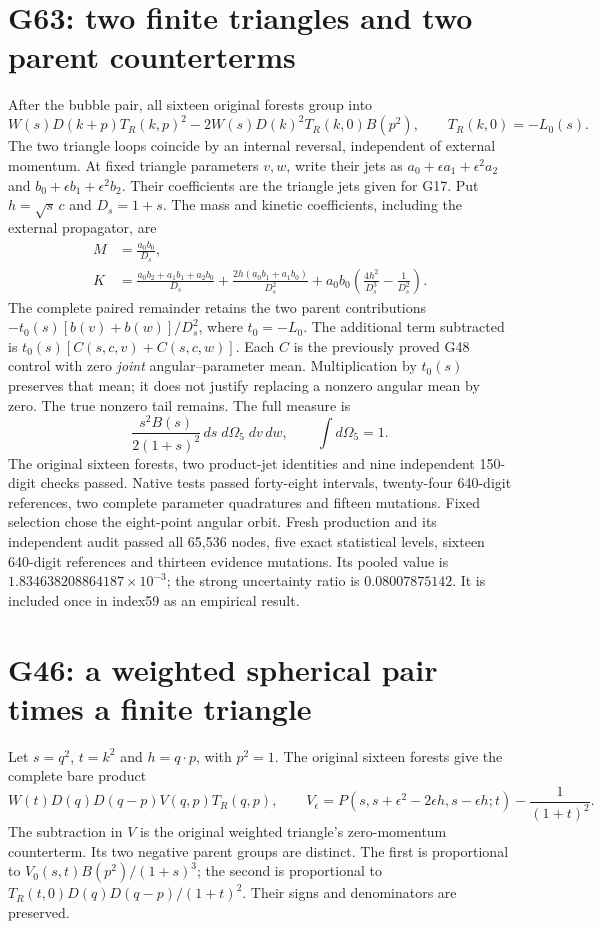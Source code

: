 \documentclass[11pt]{article}
\begin{document}
\section*{G63: two finite triangles and two parent counterterms}
After the bubble pair, all sixteen original forests group into
\[
 W(s)D(k+p)T_R(k,p)^2
 -2W(s)D(k)^2 T_R(k,0)B(p^2),\qquad T_R(k,0)=-L_0(s).
\]
The two triangle loops coincide by an internal reversal, independent of
external momentum. At fixed triangle parameters $v,w$, write their
jets as $a_0+\epsilon a_1+\epsilon^2a_2$ and
$b_0+\epsilon b_1+\epsilon^2b_2$. Their coefficients are the triangle
jets given for G17. Put $h=\sqrt s\,c$ and $D_s=1+s$. The mass and
kinetic coefficients, including the external propagator, are
\begin{align*}
 M&=\frac{a_0b_0}{D_s},\\
 K&=\frac{a_0b_2+a_1b_1+a_2b_0}{D_s}
    +\frac{2h(a_0b_1+a_1b_0)}{D_s^2}
    +a_0b_0\left(\frac{4h^2}{D_s^3}-\frac1{D_s^2}\right).
\end{align*}
The complete paired remainder retains the two parent contributions
$-t_0(s)[b(v)+b(w)]/D_s^2$, where $t_0=-L_0$.
The additional term subtracted is
$t_0(s)[C(s,c,v)+C(s,c,w)]$. Each $C$ is the previously proved G48
control with zero \emph{joint} angular--parameter mean. Multiplication
by $t_0(s)$ preserves that mean; it does not justify replacing a
nonzero angular mean by zero. The true nonzero tail remains.
The full measure is
\[
 \frac{s^2B(s)}{2(1+s)^2}\,ds\;d\Omega_5\;dv\,dw,
 \qquad \int d\Omega_5=1.
\]
The original sixteen forests, two product-jet identities and nine
independent 150-digit checks passed. Native tests passed forty-eight
intervals, twenty-four 640-digit references, two complete parameter
quadratures and fifteen mutations. Fixed selection chose the eight-point
angular orbit. Fresh production and its independent audit passed all
65,536 nodes, five exact statistical levels, sixteen 640-digit references
and thirteen evidence mutations. Its pooled value is
$1.834638208864187\times10^{-3}$; the strong uncertainty ratio is
$0.08007875142$. It is included once in index59 as an empirical result.

\section*{G46: a weighted spherical pair times a finite triangle}
Let $s=q^2$, $t=k^2$ and $h=q\cdot p$, with $p^2=1$.
The original sixteen forests give the complete bare product
\[
 W(t)D(q)D(q-p)V(q,p)T_R(q,p),\qquad
 V_\epsilon=P(s,s+\epsilon^2-2\epsilon h,s-\epsilon h;t)
                  -\frac1{(1+t)^2}.
\]
The subtraction in $V$ is the original weighted triangle's zero-momentum
counterterm. Its two negative parent groups are distinct. The first is
proportional to $V_0(s,t)B(p^2)/(1+s)^3$; the second is proportional to
$T_R(t,0)D(q)D(q-p)/(1+t)^2$. Their signs and denominators are preserved.
\end{document}
